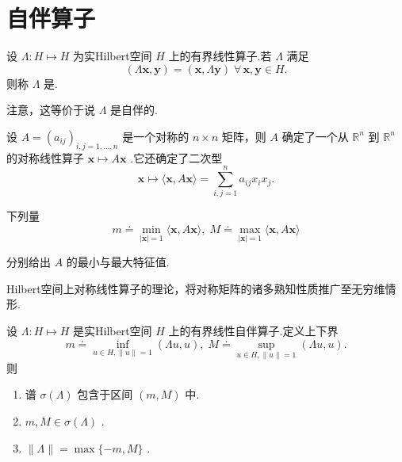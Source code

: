 \section{自伴算子}
\begin{definition}[对称算子]
    
设 $\Lambda  : H \mapsto  H$ 为实Hilbert空间 $H$ 上的有界线性算子.若 $\Lambda$ 满足
\[
\left( {\Lambda \bm{x},\bm{y}}\right)  = \left( {\bm{x},\Lambda \bm{y}}\right) \;\forall\,\bm{x},\bm{y} \in  H.
\]
则称 $\Lambda$ 是.
\end{definition}

注意，这等价于说 $\Lambda$ 是自伴的.

\begin{instance}\label{ins:symmetric-matrix-extremal-eigenvalues}
设 $A = {\left( {a}_{ij}\right) }_{i,j = 1,\ldots ,n}$ 是一个对称的 $n \times  n$ 矩阵，则 $A$ 确定了一个从 ${\mathbb{R}}^{n}$ 到 ${\mathbb{R}}^{n}$ 的对称线性算子 $\bm{x} \mapsto  A\bm{x}$ .它还确定了二次型
\[
\bm{x} \mapsto  \langle \bm{x},A\bm{x}\rangle  = \mathop{\sum }\limits_{{i,j = 1}}^{n}{a}_{ij}{x}_{i}{x}_{j}.
\]

下列量
\[
m \doteq  \mathop{\min }\limits_{{\left| \bm{x}\right|  = 1}}\langle \bm{x},A\bm{x}\rangle ,\;M \doteq  \mathop{\max }\limits_{{\left| \bm{x}\right|  = 1}}\langle \bm{x},A\bm{x}\rangle
\]

分别给出 $A$ 的最小与最大特征值.
\end{instance}

Hilbert空间上对称线性算子的理论，将对称矩阵的诸多熟知性质推广至无穷维情形.

\begin{lemma}[对称算子谱的界]\label{lem:selfadjoint-spectrum-bounds}
设 $\Lambda  : H \mapsto  H$ 是实Hilbert空间 $H$ 上的有界线性自伴算子.定义上下界
\[
m \doteq  \mathop{\inf }\limits_{{u \in  H,\| u\|  = 1}}\left( {{\Lambda u},u}\right) ,\;M \doteq  \mathop{\sup }\limits_{{u \in  H,\| u\|  = 1}}\left( {{\Lambda u},u}\right) .
\]
则
\begin{enumerate}
    \item 谱 $\sigma \left( \Lambda \right)$ 包含于区间 $\left(  {m,M}\right)$ 中.
    \item $m,M \in  \sigma \left( \Lambda \right)$ .
    \item $\| \Lambda \|  = \max \{  - m,M\}$ .
\end{enumerate}
\end{lemma}

